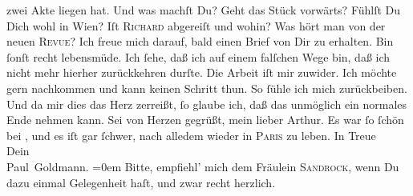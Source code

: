 \begin{ledgroupsized}[t]{13cm}
               zwei Akte liegen hat.\pend
           \pstart
           Und was machſt Du? Geht das Stück vorwärts? Fühlſt Du Dich wohl in Wien? Iſt \textsc{Richard} abgereiſt und wohin? Was hört man von der neuen \textsc{Revue}?\pend
           \pstart
           {\pb}Ich freue mich darauf, bald einen Brief von Dir zu
               erhalten. Bin ſonſt recht lebensmüde. Ich ſehe, daß ich auf einem falſchen Wege bin,
               daß ich nicht mehr hierher zurückkehren durſte. Die Arbeit iſt mir zuwider. Ich
               möchte gern nachkommen und kann keinen Schritt thun. So ſühle ich mich zurückbeiben.
               Und da mir dies das Herz zerreißt, ſo glaube ich, daß das unmöglich ein normales Ende
               nehmen kann.\pend
           \pstart
           {\pb}Sei von Herzen gegrüßt, mein lieber Arthur. Es war
               ſo ſchön bei \label{K_L02614-7v}\label{K_L02614-7h}, und es iſt gar ſchwer, nach alledem wieder in \textsc{Paris} zu leben.\pend
           \pstart
           In Treue{\\[\baselineskip]} Dein{\\[\baselineskip]}\spacefill\mbox{Paul Goldmann.}\pend
           \leftskip=0em{}\pstart
           \noindent{}Bitte, empfiehl’ mich dem Fräulein \textsc{Sandrock}, wenn Du dazu einmal Gelegenheit haſt, und  zwar recht herzlich.\pend
           
         
         \endnumbering{}\end{ledgroupsized}  \newcommand{\dateiname}{L02614}\newcommand{\titel}{Paul Goldmann an Arthur Schnitzler, 21. 9. [1894]}\newcommand{\editorInnen}{Martin Anton Müller und Laura Untner}
      